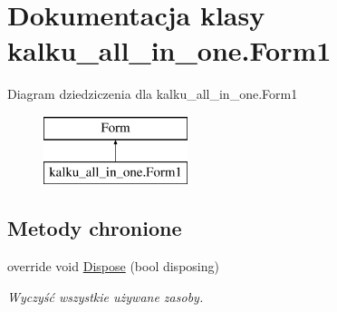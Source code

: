 \hypertarget{classkalku__all__in__one_1_1_form1}{}\section{Dokumentacja klasy kalku\+\_\+all\+\_\+in\+\_\+one.\+Form1}
\label{classkalku__all__in__one_1_1_form1}
Diagram dziedziczenia dla kalku\+\_\+all\+\_\+in\+\_\+one.\+Form1\begin{figure}[H]
\begin{center}
\leavevmode
\includegraphics[height=2.000000cm]{classkalku__all__in__one_1_1_form1}
\end{center}
\end{figure}
\subsection*{Metody chronione}
\begin{DoxyCompactItemize}
\item 
override void \mbox{\hyperlink{classkalku__all__in__one_1_1_form1_a4bd45197a52ffd3416ed40e537314dd7}{Dispose}} (bool disposing)
\begin{DoxyCompactList}\small\item\em Wyczyść wszystkie używane zasoby. \end{DoxyCompactList}\end{DoxyCompactItemize}
